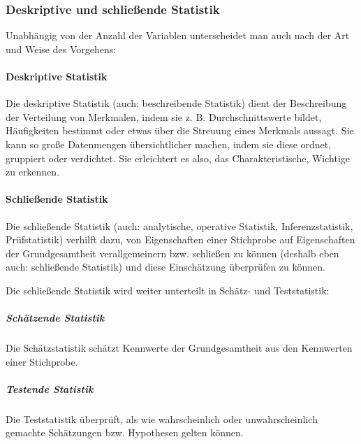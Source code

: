 \documentclass[
  11pt,
  ngerman,
  a4paper,
]{report}
\begin{document}
\hypertarget{deskriptive-und-schlieuxdfende-statistik}{%
\subsubsection{Deskriptive und schließende Statistik}\label{deskriptive-und-schlieuxdfende-statistik}}

Unabhängig von der Anzahl der Variablen unterscheidet man auch nach der Art und Weise des Vorgehens:

\hypertarget{deskriptive-statistik}{%
\paragraph{Deskriptive Statistik}\label{deskriptive-statistik}}

Die deskriptive Statistik (auch: beschreibende Statistik) dient der Beschreibung der Verteilung von Merkmalen, indem sie z. B. Durchschnittswerte bildet, Häufigkeiten bestimmt oder etwas über die Streuung eines Merkmals aussagt. Sie kann so große Datenmengen übersichtlicher machen, indem sie diese ordnet, gruppiert oder verdichtet. Sie erleichtert es also, das Charakteristische, Wichtige zu erkennen.

\hypertarget{schlieuxdfende-statistik}{%
\paragraph{Schließende Statistik}\label{schlieuxdfende-statistik}}

Die schließende Statistik (auch: analytische, operative Statistik, Inferenzstatistik, Prüfstatistik) verhilft dazu, von Eigenschaften einer Stichprobe auf Eigenschaften der Grundgesamtheit verallgemeinern bzw. schließen zu können (deshalb eben auch: schließende Statistik) und diese Einschätzung überprüfen zu können.

Die schließende Statistik wird weiter unterteilt in Schätz- und Teststatistik:

\hypertarget{schuxe4tzende-statistik}{%
\subparagraph{Schätzende Statistik}\label{schuxe4tzende-statistik}}

Die Schätzstatistik schätzt Kennwerte der Grundgesamtheit aus den Kennwerten einer Stichprobe.

\hypertarget{testende-statistik}{%
\subparagraph{Testende Statistik}\label{testende-statistik}}

Die Teststatistik überprüft, als wie wahrscheinlich oder unwahrscheinlich gemachte Schätzungen bzw. Hypothesen gelten können.
\end{document}
